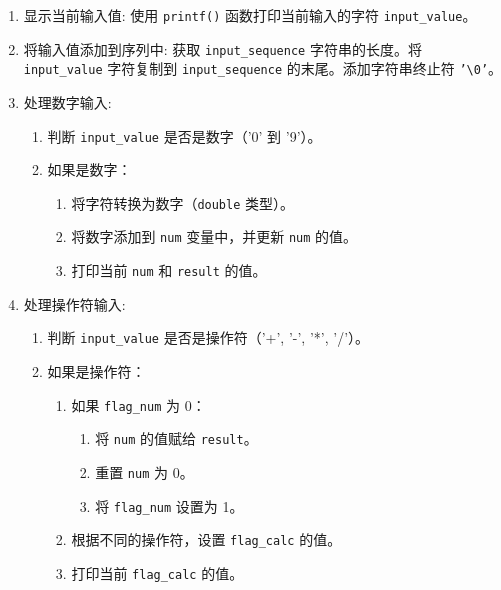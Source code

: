\documentclass{theme-2639013-final}
\begin{document}
\begin{enumerate}

  \item 显示当前输入值: 使用 \texttt{printf()} 函数打印当前输入的字符 \texttt{input\_value}。
  \item 将输入值添加到序列中: 获取 \texttt{input\_sequence} 字符串的长度。将 \texttt{input\_value} 字符复制到 \texttt{input\_sequence} 的末尾。添加字符串终止符 \texttt{'\textbackslash 0'}。

  \item 处理数字输入:
    \begin{enumerate}
      \item 判断 \texttt{input\_value} 是否是数字（'0' 到 '9'）。
      \item 如果是数字：
        \begin{enumerate}
          \item 将字符转换为数字（\texttt{double} 类型）。
          \item 将数字添加到 \texttt{num} 变量中，并更新 \texttt{num} 的值。
          \item 打印当前 \texttt{num} 和 \texttt{result} 的值。
        \end{enumerate}
    \end{enumerate}

  \item 处理操作符输入:

    \begin{enumerate}
      \item 判断 \texttt{input\_value} 是否是操作符（'+', '-', '*', '/'）。
      \item 如果是操作符：
        \begin{enumerate}
          \item 如果 \texttt{flag\_num} 为 0：
            \begin{enumerate}
              \item 将 \texttt{num} 的值赋给 \texttt{result}。
              \item 重置 \texttt{num} 为 0。
              \item 将 \texttt{flag\_num} 设置为 1。
            \end{enumerate}
          \item 根据不同的操作符，设置 \texttt{flag\_calc} 的值。
          \item 打印当前 \texttt{flag\_calc} 的值。
        \end{enumerate}
    \end{enumerate}


\end{enumerate}
\end{document}
